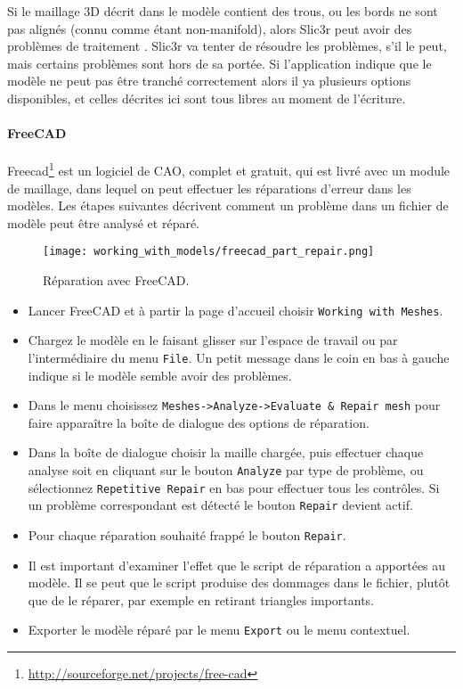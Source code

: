 
Si le maillage 3D décrit dans le modèle contient des trous, ou les bords ne sont pas alignés (connu comme étant non-manifold), alors Slic3r peut avoir des problèmes de traitement . Slic3r va tenter de résoudre les problèmes, s'il le peut, mais certains problèmes sont hors de sa portée. Si l'application indique que le modèle ne peut pas être tranché correctement alors il ya plusieurs options disponibles, et celles décrites ici sont tous libres au moment de l'écriture.

{}

\paragraph{FreeCAD} %
\label{par:freecad}

Freecad\footnote{\url{http://sourceforge.net/projects/free-cad}} est un logiciel de CAO, complet et gratuit, qui est livré avec un module de maillage, dans lequel on peut effectuer les réparations d'erreur dans les modèles. Les étapes suivantes décrivent comment un problème dans un fichier de modèle peut être analysé et réparé.

\begin{figure}[H]
\centering
\texttt{[image: working\_with\_models/freecad\_part\_repair.png]}
\caption{Réparation avec FreeCAD.}
\label{fig:freecad_part_repair}
\end{figure}

\begin{itemize}
	\item Lancer FreeCAD et à partir la page d'accueil choisir \texttt{Working with Meshes}.
	\item Chargez le modèle en le faisant glisser sur l'espace de travail ou par l'intermédiaire du menu \texttt{File}.  Un petit message dans le coin en bas à gauche indique si le modèle semble avoir des problèmes.
	\item Dans le menu choisissez \texttt{Meshes->Analyze->Evaluate \& Repair mesh} pour faire apparaître la boîte de dialogue des options de réparation.
	\item Dans la boîte de dialogue choisir la maille chargée, puis effectuer chaque analyse soit en cliquant sur le bouton \texttt{Analyze} par type de problème, ou sélectionnez \texttt{Repetitive Repair} en bas pour effectuer tous les contrôles. Si un problème  correspondant est détecté le bouton \texttt{Repair} devient actif.
	\item Pour chaque réparation souhaité frappé le bouton \texttt{Repair}.
	\item Il est important d'examiner l'effet que le script de réparation a apportées au modèle.  Il se peut que le script produise des dommages dans le fichier, plutôt que de le réparer, par exemple en retirant triangles importants.
	\item Exporter le modèle réparé par le menu \texttt{Export} ou le menu contextuel.
\end{itemize}
